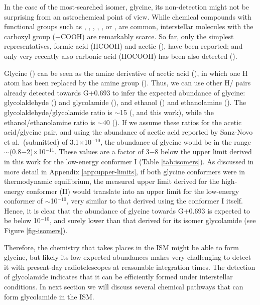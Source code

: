 \documentclass[twocolumn]{aastex63}
\begin{document}
In the case of the most-searched isomer, glycine, its non-detection might not be surprising from an astrochemical point of view. While chemical compounds with functional groups such as , , , , , or , are common,  interstellar molecules with the carboxyl group ($-$COOH) are remarkably scarce. So far, only the simplest representatives, formic acid (HCOOH) and acetic (), have been reported; and only very recently also carbonic acid (HOCOOH) has been also detected (\citealt{sanz-novo2023}).

Glycine () can be seen as the amine derivative of acetic acid (), in which one H atom has been replaced by the amine group (). Thus, we can use other H/ pairs already detected towards G+0.693 to infer the expected abundance of glycine: glycolaldehyde () and glycolamide (), and ethanol () and ethanolamine (). The glycolaldehyde/glycolamide ratio is $\sim$15 (\citealt{rivilla2022a}, and this work), while the ethanol/ethanolamine ratio is $\sim$40 (\citealt{rivilla2021a,rodriguez-almeida2021a}). If we assume these ratios for the acetic acid/glycine pair, and using the abundance of acetic acid reported by Sanz-Novo et al.~(submitted) of 3.1$\times$10$^{-10}$, the abundance of glycine would be in the range $\sim$(0.8$-$2)$\times$10$^{-11}$. These values are a factor of 3$-$8 below the upper limit derived in this work for the low-energy conformer I (Table \ref{tab:isomers}). As discussed in more detail in Appendix \ref{app:upper-limits}, if both glycine conformers were in thermodynamic equilibrium, the measured upper limit derived for the high-energy conformer (II) would translate into an upper limit for the low-energy conformer of $\sim$10$^{-10}$, very similar to that derived using the conformer I itself. Hence, it is clear that the abundance of glycine towards G+0.693 is expected to be below 10$^{-10}$, and surely lower than that derived for its isomer glycolamide (see Figure \ref{fig-isomers}).

Therefore, the chemistry that takes places in the ISM might be able to form glycine, but likely its low expected abundances makes very challenging to detect it with present-day radiotelescopes at reasonable integration times. The detection of glycolamide indicates that it can be efficiently formed under interstellar conditions. In next section we will discuss several chemical pathways that can form glycolamide in the ISM.
\end{document}
